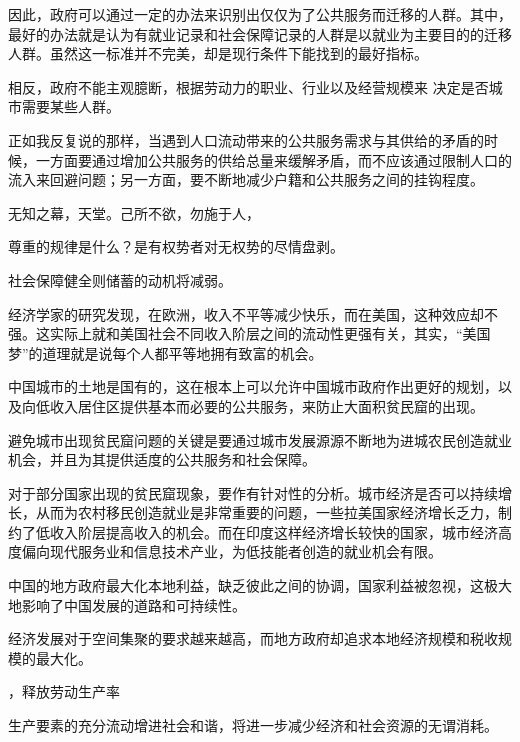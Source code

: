 因此，政府可以通过一定的办法来识别出仅仅为了公共服务而迁移的人群。其中，最好的办法就是认为有就业记录和社会保障记录的人群是以就业为主要目的的迁移人群。虽然这一标准并不完美，却是现行条件下能找到的最好指标。

相反，政府不能主观臆断，根据劳动力的职业、行业以及经营规模来 决定是否城市需要某些人群。


正如我反复说的那样，当遇到人口流动带来的公共服务需求与其供给的矛盾的时候，一方面要通过增加公共服务的供给总量来缓解矛盾，而不应该通过限制人口的流入来回避问题；另一方面，要不断地减少户籍和公共服务之间的挂钩程度。

无知之幕，天堂。己所不欲，勿施于人，


尊重的规律是什么？是有权势者对无权势的尽情盘剥。


社会保障健全则储蓄的动机将减弱。

经济学家的研究发现，在欧洲，收入不平等减少快乐，而在美国，这种效应却不强。这实际上就和美国社会不同收入阶层之间的流动性更强有关，其实，“美国梦”的道理就是说每个人都平等地拥有致富的机会。

中国城市的土地是国有的，这在根本上可以允许中国城市政府作出更好的规划，以及向低收入居住区提供基本而必要的公共服务，来防止大面积贫民窟的出现。

避免城市出现贫民窟问题的关键是要通过城市发展源源不断地为进城农民创造就业机会，并且为其提供适度的公共服务和社会保障。

对于部分国家出现的贫民窟现象，要作有针对性的分析。城市经济是否可以持续增长，从而为农村移民创造就业是非常重要的问题，一些拉美国家经济增长乏力，制约了低收入阶层提高收入的机会。而在印度这样经济增长较快的国家，城市经济高度偏向现代服务业和信息技术产业，为低技能者创造的就业机会有限。

中国的地方政府最大化本地利益，缺乏彼此之间的协调，国家利益被忽视，这极大地影响了中国发展的道路和可持续性。

经济发展对于空间集聚的要求越来越高，而地方政府却追求本地经济规模和税收规模的最大化。

，释放劳动生产率

生产要素的充分流动增进社会和谐，将进一步减少经济和社会资源的无谓消耗。

